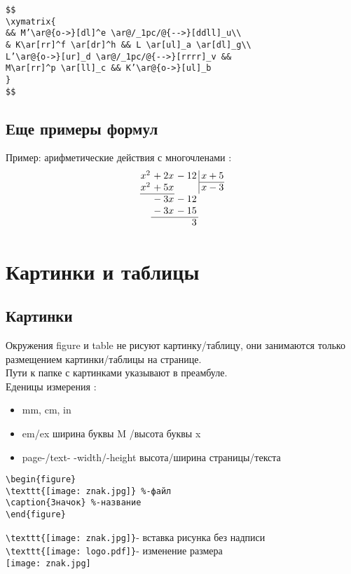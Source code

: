 \documentclass[a4paper,12pt]{article}%
\theoremstyle{plain}%
\theoremstyle{definition}%
\theoremstyle{remark}%
\begin{document}
\begin{verbatim}
$$ 
\xymatrix{ 
&& M’\ar@{o->}[dl]^e \ar@/_1pc/@{-->}[ddll]_u\\ 
& K\ar[rr]^f \ar[dr]^h && L \ar[ul]_a \ar[dl]_g\\ 
L’\ar@{o->}[ur]_d \ar@/_1pc/@{-->}[rrrr]_v && 
M\ar[rr]^p \ar[ll]_c && K’\ar@{o->}[ul]_b 
} 
$$
\end{verbatim}



\subsection{Еще примеры формул}

Пример: арифметические действия с многочленами : \\
$$
\arraycolsep=0.05em
\begin{array}{rrr@{\,}r|r}
x^2&{}+2x&{}-12&&\,x+5\\
\cline{5-5}
x^2&{}+5x&&&\,x-3\\
\cline{1-2}
&{}-3x&{}-12\\
&{}-3x&{}-15\\
\cline{2-3}
&&3
\end{array}
$$



\section{Картинки и таблицы}
\subsection{Картинки}

Окружения figure и table не рисуют картинку/таблицу, они занимаются только размещением картинки/таблицы на странице. \\
Пути к папке с картинками указывают в преамбуле. \\
Еденицы измерения : 
\begin{itemize}
\item mm, cm, in
\item em/ex ширина буквы M /высота буквы x
\item page-/text- {-width/-height} высота/ширина страницы/текста
\end{itemize}
\begin{verbatim}
\begin{figure}
\texttt{[image: znak.jpg]} %-файл
\caption{Значок} %-название
\end{figure}
\end{verbatim}
\verb|\texttt{[image: znak.jpg]}|- вставка рисунка без надписи\\
\verb|\texttt{[image: logo.pdf]}|- изменение размера \\
\texttt{[image: znak.jpg]}
\end{document}

